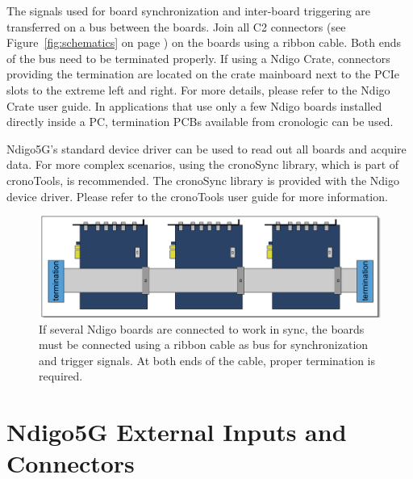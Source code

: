 The signals used for board synchronization and inter-board triggering are transferred on a bus between the boards. Join all C2 connectors (see Figure~\ref{fig:schematics} on page \pageref{fig:schematics}) on the boards using a ribbon cable. Both ends of the bus need to be terminated properly. If using a Ndigo Crate, connectors providing the termination are located on the crate mainboard next to the PCIe slots to the extreme left and right. For more details, please refer to the Ndigo Crate user guide. In applications that use only a few Ndigo boards installed directly inside a PC, termination PCBs available from cronologic can be used.\par
Ndigo5G's standard device driver can be used to read out all boards and acquire data. For more complex scenarios, using the cronoSync library, which is part of cronoTools, is recommended. The cronoSync library is provided with the Ndigo device driver. Please refer to the cronoTools user guide for more information.
%
\begin{figure}[ht]
    \centering
    \includegraphics[width=\textwidth]{figures/Ndigo_Intercon.pdf}
    \caption{If several Ndigo boards are connected to work in sync, the boards must be connected using a ribbon cable as bus for synchronization and trigger signals. At both ends of the cable, proper termination is required.}
\end{figure}
%
%
%
%
%
\clearpage
\section{Ndigo5G External Inputs and Connectors}
